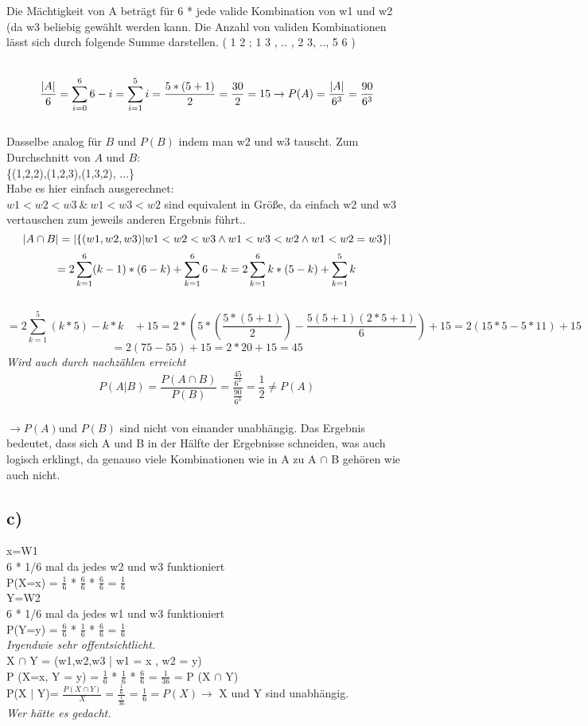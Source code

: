 \documentclass[11pt]{article} %
\begin{document}
Die Mächtigkeit von A beträgt für 6 * jede valide Kombination von w1 und w2 (da w3 beliebig gewählt werden kann. Die Anzahl von validen Kombinationen lässt sich durch folgende Summe darstellen. ( 1 2 ; 1 3 , .. , 2 3, .., 5 6 ) \\ \ \\
{$$\frac{|A|}{6}=\sum_{i=0}^{6} 6-i = \sum_{i=1}^{5} i = \frac{5*(5+1)}{2}=\frac{30}{2}=15
\\
\rightarrow P(A)=\frac{|A|}{6^3} = \frac{90}{6^3}$$ \\
Dasselbe analog für $B$ und $P(B)$ indem man w2 und w3 tauscht.
Zum Durchschnitt von $A$ und $B$:\\
\{(1,2,2),(1,2,3),(1,3,2), ...\}\\

Habe es hier einfach ausgerechnet: \\ $w1<w2<w3 \ \& \ w1<w3<w2$ sind equivalent in Größe, da einfach w2 und w3 vertauschen zum jeweils anderen Ergebnis führt..
$$|A\cap B| = |\{(w1,w2,w3)|w1<w2< w3 \land w1 <w3<w2  \land w1<w2=w3\}|\\ $$
 $$=2  \sum_{k=1}^{6} (k-1) * (6-k) + \sum_{k=1}^{6} 6-k = 2  \sum_{k=1}^6 k*(5-k) + \sum_{k=1}^5 k  \\  $$ \\ $$=2 \sum_{k=1}^5 {(k*5) - k*k} \ \ \ \     + 15 = 2*(5 * (\frac{5* (5+1) }{2}) - \frac{5(5+1)(2 * 5 +1)}{6}) +15 =2 (15 * 5 - 5 * 11) +15$$
 $$=2  (75 - 55) + 15= 2 *20+15 = 45  $$   \textit{Wird auch durch nachzählen erreicht} \\ 
 
$$P(A|B) =\frac{P(A \cap B )}{P(B)} =  \frac{\frac{45}{6^3}}{\frac{90}{6^3}} = \frac{1}{2} \neq P(A) $$\\
$\rightarrow P(A)$und  $  P(B)$  sind nicht von einander unabhängig.  Das Ergebnis bedeutet, dass sich A und B in der Hälfte der Ergebnisse schneiden, was auch logisch erklingt, da genauso viele Kombinationen wie in A zu A $\cap$ B gehören wie auch nicht.



\subsection*{c)}
x=W1  \\ 6 * 1/6 mal da jedes w2 und w3 funktioniert \\
P(X=x) =  $\frac{1}{6}$ *  $\frac{6}{6}$ * $\frac{6}{6}$ = $\frac{1}{6}$ \\
Y=W2 \\ 6 * 1/6 mal da jedes w1 und w3 funktioniert \\
P(Y=y) = $\frac{6}{6}$ * $\frac{1}{6}$ * $\frac{6}{6}$ = $\frac{1}{6}$ \\
\textit{ Irgendwie sehr offentsichtlicht.} \\
X $\cap$ Y = {(w1,w2,w3 | w1 = x , w2 = y)} \\
P (X=x, Y = y) = $\frac{1}{6}$ * $\frac{1}{6}$ * $\frac{6}{6}$ = $\frac{1}{36}$ = P (X $\cap$ Y) \\
P(X $|$ Y)= $\frac{P(X \cap Y)}{X} = \frac{\frac{1}{6}}{\frac{1}{36}}$    = $\frac{1}{6} = P (X) \rightarrow$ X und Y sind unabhängig.\\
\textit{Wer hätte es gedacht. }
}
\end{document}
